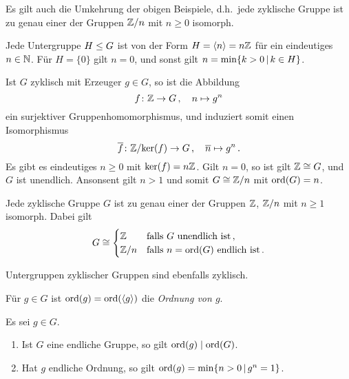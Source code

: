Es gilt auch die Umkehrung der obigen Beispiele, d.h.\ jede zyklische Gruppe ist zu genau einer der Gruppen $\mathbb{Z}/n$ mit $n \geq 0$ isomorph.

\begin{lemma}
\label{lemma: subgroups of Z}
  Jede Untergruppe $H \mathrel{\leq} G$ ist von der Form $H = \langle n\rangle = n\mathbb{Z}$ für ein eindeutiges $n \in \mathbb{N}$.
  Für $H = \{0\}$ gilt $n = 0$, und sonst gilt $n = \min \{k > 0 \suchthat k \in H\}$.
\end{lemma}

Ist $G$ zyklisch mit Erzeuger $g \in G$, so ist die Abbildung
\[
          f
  \colon  \mathbb{Z}
  \to     G \,,
  \quad   n
  \mapsto g^n
\]
ein surjektiver Gruppenhomomorphismus, und induziert somit einen Isomorphismus
\[
          \overline{f}
  \colon  \mathbb{Z}/{\ker(f)}
  \to     G \,,
  \quad   \overline{n}
  \mapsto g^n \,.
\]
Es gibt es eindeutiges $n \geq 0$ mit $\ker(f) = n\mathbb{Z}$.
Gilt $n = 0$, so ist gilt $\mathbb{Z} \cong G$, und $G$ ist unendlich.
Ansonsent gilt $n > 1$ und somit $G \cong \mathbb{Z}/n$ mit $\operatorname{ord}(G) = n$.

\begin{corollary}
  Jede zyklische Gruppe $G$ ist zu genau einer der Gruppen $\mathbb{Z}$, $\mathbb{Z}/n$ mit $n \geq 1$ isomorph.
  Dabei gilt
  \[
          G
    \cong \begin{cases}
              \mathbb{Z}
            & \text{falls $G$ unendlich ist} \,,
          \\
              \mathbb{Z}/n
            & \text{falls $n = \operatorname{ord}(G)$ endlich ist} \,.
          \end{cases}
  \]
\end{corollary}

\begin{corollary}
  Untergruppen zyklischer Gruppen sind ebenfalls zyklisch.
\end{corollary}

\begin{definition}
  Für $g \in G$ ist $\operatorname{ord}(g) = \operatorname{ord}(\langle g\rangle)$ die \emph{Ordnung von $g$}.
\end{definition}

\begin{lemma}
  Es sei $g \in G$.
  \begin{enumerate}
    \item
      Ist $G$ eine endliche Gruppe, so gilt $\operatorname{ord}(g) \mathrel{|} \operatorname{ord}(G)$.
    \item
      Hat $g$ endliche Ordnung, so gilt $\ord{g} = \min \{ n > 0 \suchthat g^n = 1 \}$.
  \end{enumerate}
\end{lemma}

